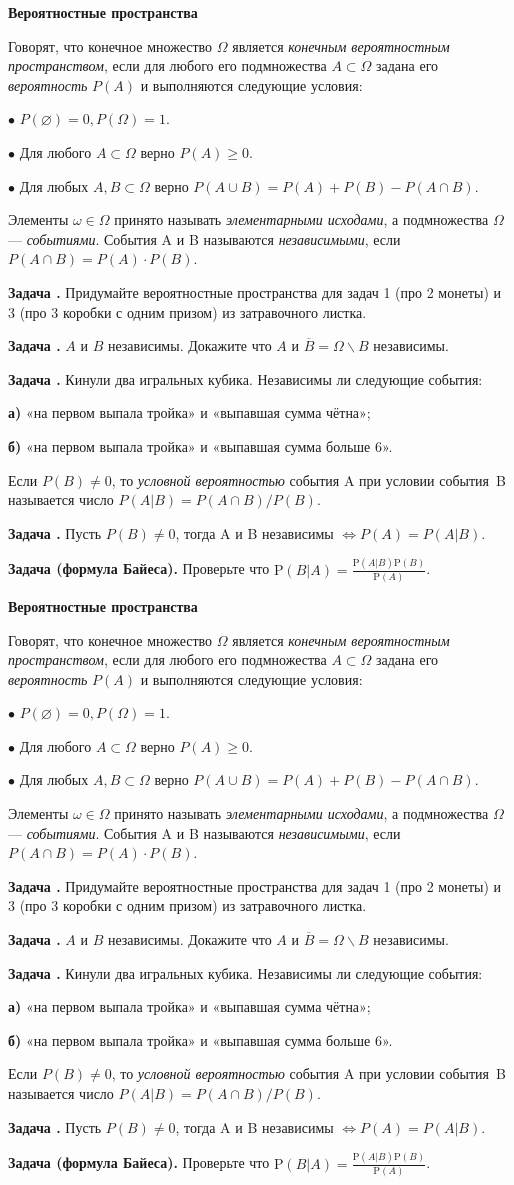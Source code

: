 \documentclass[11pt,a4paper]{article}
\def\P{\mathrm{P}}
\newcounter{znum}
\newcommand{\z}[1]{\addtocounter{znum}{1} \textbf{Задача \arabic{znum}#1. }}
\renewcommand{\!}{\textcolor{red}{!}}
\newcommand{\double}[1]{
	#1
	\vspace{2cm}
	#1
}
\begin{document}
\thispagestyle{empty}

\double{

\begin{center}
	\large
	\textbf{Вероятностные пространства}
	\normalsize
\end{center}

Говорят, что конечное множество $\Omega$ является \emph{конечным вероятностным пространством}, если для любого его подмножества $A \subset \Omega$ задана его \emph{вероятность} $P(A)$ и выполняются следующие условия:

$\bullet$ $P(\varnothing) = 0, P(\Omega) = 1$.

$\bullet$ Для любого $A \subset \Omega$ верно $P(A) \geqslant 0$.

$\bullet$ Для любых $A, B\subset \Omega$ верно $P(A\cup B) = P(A) + P(B) - P(A\cap B)$.

Элементы $\omega \in \Omega$ принято называть \emph{элементарными исходами}, а подмножества $\Omega$ --- \emph{событиями}. События A и B называются \emph{независимыми}, если $P(A \cap B) = P(A) \cdot P(B)$.

\z{} Придумайте вероятностные пространства для задач 1 (про 2 монеты) и 3 (про 3 коробки с одним призом) из затравочного листка.

\z{} $A$ и $B$ независимы. Докажите что $A$ и $\overline{B} = \Omega \backslash B$ независимы.

\z{} Кинули два игральных кубика. Независимы ли следующие события:

\textbf{а)} «на первом выпала тройка» и «выпавшая сумма чётна»;

\textbf{б)} «на первом выпала тройка» и «выпавшая сумма больше 6».


Если $P(B) \ne 0$, то \emph{условной вероятностью} события A при условии события~B называется число $P(A|B) = P(A \cap B)/P(B)$.

\z{} Пусть $P(B) \ne 0$, тогда A и B независимы $ \Leftrightarrow P(A) = P(A|B)$.

\z{ (формула Байеса)} Проверьте что $\P(B | A) = \frac{\P(A | B)\P(B)}{\P(A)}$.

}
\end{document}
